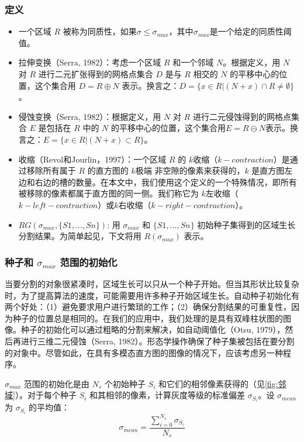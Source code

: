 \subsubsection{定义}
\begin{itemize}
    \item 一个区域 $R$ 被称为同质性，如果$\sigma \leq \sigma_{max}$，其中$\sigma_{max}$是一个给定的同质性阈值。
    \item 拉伸变换（Serra, 1982\cite{serra1982image}）：考虑一个区域 $R$ 和一个邻域 $N$。根据定义，用 $N$ 对 $R$ 进行二元扩张得到的网格点集合 $D$ 是与 $R$ 相交的 $N$ 的平移中心的位置，这个集合用 $D=R \oplus N$ 表示。换言之：$D=\{x \in R |(N+x) \cap R \neq \emptyset\}$。
    \item 侵蚀变换（Serra, 1982\cite{serra1982image}）：根据定义，用 $N$ 对 $R$ 进行二元侵蚀得到的网格点集合 $E$ 是包括在 $R$ 中的 $N$ 的平移中心的位置，这个集合用$E=R \ominus N$表示。换言之：$E=\{x \in R |(N+x) \subset R\}$。
    \item 收缩（Revol和Jourlin，1997\cite{revol1997new}）：一个区域 $R$ 的 $k收缩$（$k-contraction$）是通过移除所有属于 $R$ 的直方图的 $k极端$ 非空隙的像素来获得的，$k$ 是直方图左边和右边的槽的数量。在本文中，我们使用这个定义的一个特殊情况，即所有被移除的像素都属于直方图的同一侧。我们称它为 $k左收缩$（$k-left-contraction$）或$k右收缩$（$k-right-contraction$）。
    \item $RG(\sigma_{max}, \{S1,\dots,Sn\})$: 用 $\sigma_{max}$ 和 $\{S1,\dots,Sn\}$ 初始种子集得到的区域生长分割结果。为简单起见，下文将用 $R(\sigma_{max})$ 表示。
\end{itemize}

\subsubsection{种子和 $\sigma_{max}$ 范围的初始化}\label{sec:初始化}

当要分割的对象很紧凑时，区域生长可以只从一个种子开始。但当其形状比较复杂时，为了提高算法的速度，可能需要用许多种子开始区域生长。自动种子初始化有两个好处：（1）避免要求用户进行繁琐的工作；（2）确保分割结果的可重复性，因为种子的位置总是相同的。在我们的应用中，我们处理的是具有双峰柱状图的图像。种子的初始化可以通过粗略的分割来解决，如自动阈值化（Otsu, 1979\cite{otsu1979threshold}），然后再进行三维二元侵蚀（Serra, 1982\cite{serra1982image}）。形态学操作确保了种子集被包括在要分割的对象中。尽管如此，在具有多模态直方图的图像的情况下，应该考虑另一种程序。

$\sigma_{max}$ 范围的初始化是由 $N_s$ 个初始种子 $S_i$ 和它们的相邻像素获得的（见\cref{fig:邻域}）。对于每个种子 $S_i$ 和其相邻的像素，计算灰度等级的标准偏差 $\sigma_{S_i}$。设 $\sigma_{mean}$ 为 $\sigma_{S_i}$ 的平均值：
\begin{equation}
    \sigma_{mean}=\frac{\sum_{i = 0}^{N_s} \sigma_{S_i}}{N_s}
\end{equation}

